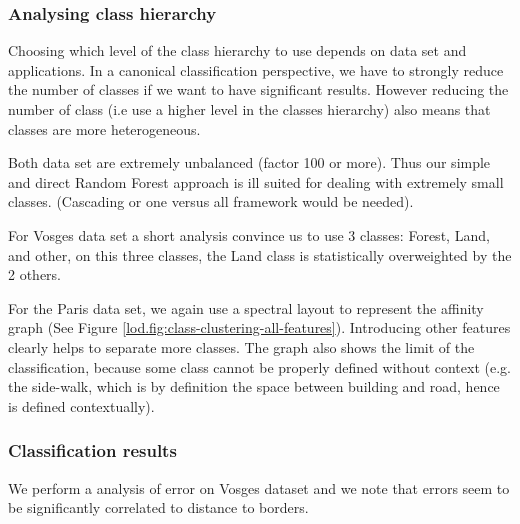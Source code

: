 		\subsubsection{Analysing class hierarchy} 
		
		Choosing which level of the class hierarchy to use depends on data set and applications.
		In a canonical classification perspective, we have to strongly reduce the number of classes if we want to have significant results.
		However reducing the number of class (i.e use a higher level in the classes hierarchy) also means that classes are more heterogeneous.
		  
		Both data set are extremely unbalanced (factor 100 or more). Thus our simple and direct Random Forest approach is ill suited for dealing with extremely small classes. (Cascading or one versus all framework would be needed).
		
		For Vosges data set a short analysis convince us to use 3 classes: Forest, Land, and other, on this three classes, the Land class is statistically overweighted by the 2 others.
		
		For the Paris data set, we again use a spectral layout to represent the affinity graph (See Figure \ref{lod.fig:class-clustering-all-features}).
		Introducing other features clearly helps to separate more classes.
		The graph also shows the limit of the classification, because some class cannot be properly defined without context (e.g. the side-walk, which is by definition the space between building and road, hence is defined contextually). 
		
		\subsubsection{Classification results}
		We perform a analysis of error on Vosges dataset and we note that errors seem to be significantly correlated to distance to borders. 
				 
